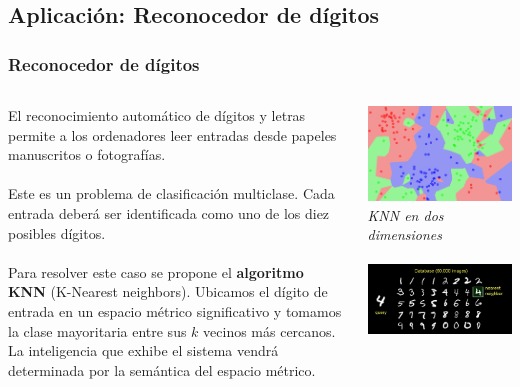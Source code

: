 \documentclass[8pt]{beamer}
\begin{document}
  \subsection{Aplicación: Reconocedor de dígitos}
    \begin{frame}
      \frametitle{Reconocedor de dígitos}
      \begin{columns}[c]
       \begin{column}{.5\textwidth}
	 \justifying
         El reconocimiento automático de dígitos y letras permite a los ordenadores
         leer entradas desde papeles manuscritos o fotografías.
         \\~\\
         Este es un problema de clasificación multiclase. Cada entrada deberá ser identificada
         como uno de los diez posibles dígitos.
         \\~\\
         Para resolver este caso se propone el \textbf{algoritmo KNN} (K-Nearest neighbors). 
         Ubicamos el dígito de entrada en un espacio métrico significativo y tomamos la clase mayoritaria 
         entre sus $k$ vecinos más cercanos. La inteligencia que exhibe el sistema vendrá
         determinada por la semántica del espacio métrico.
       \end{column}
       \begin{column}{.5\textwidth}
	  \begin{center}
	  \includegraphics[width=.8\textwidth]{imgs/knn.png} %
	  \\ \centering \textit{KNN en dos dimensiones}
	  \\~\\
	  \includegraphics[width=.8\textwidth]{imgs/digit_database.jpg} %

\end{center}
\end{column}
\end{columns}
\end{frame}
\end{document}
